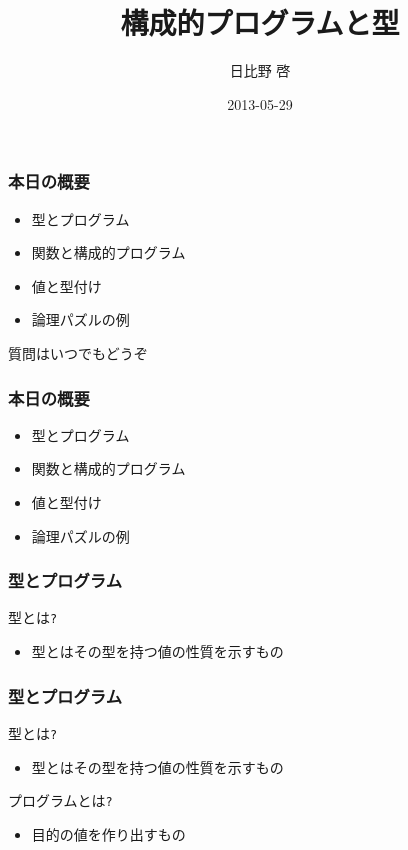 \documentclass[cjk,dvipdfm,14pt]{beamer}
\title{構成的プログラムと型}
\author{日比野 啓}
\date{2013-05-29}
\begin{document}
\begin{frame}
\maketitle
\end{frame}

\begin{frame}[fragile]
\frametitle{本日の概要}

\begin{itemize}
\item 型とプログラム
\item 関数と構成的プログラム
\item 値と型付け
\item 論理パズルの例
\end{itemize}

\end{frame}

\begin{frame}[fragile]
質問はいつでもどうぞ
\end{frame}

\begin{frame}[fragile]
\frametitle{本日の概要}

\begin{itemize}
\item { \color{red} 型とプログラム }
\item 関数と構成的プログラム
\item 値と型付け
\item 論理パズルの例
\end{itemize}

\end{frame}

\begin{frame}[fragile]
\frametitle{型とプログラム}
型とは\verb|?|
\begin{itemize}
\item { \color{red} 型とはその型を持つ値の性質を示すもの }
\end{itemize}
\end{frame}

\begin{frame}[fragile]
\frametitle{型とプログラム}

型とは\verb|?|
\begin{itemize}
\item 型とはその型を持つ値の性質を示すもの
\end{itemize}

プログラムとは\verb|?|
\begin{itemize}
\item { \color{red} 目的の値を作り出すもの }
\end{itemize}

\end{frame}
\end{document}
